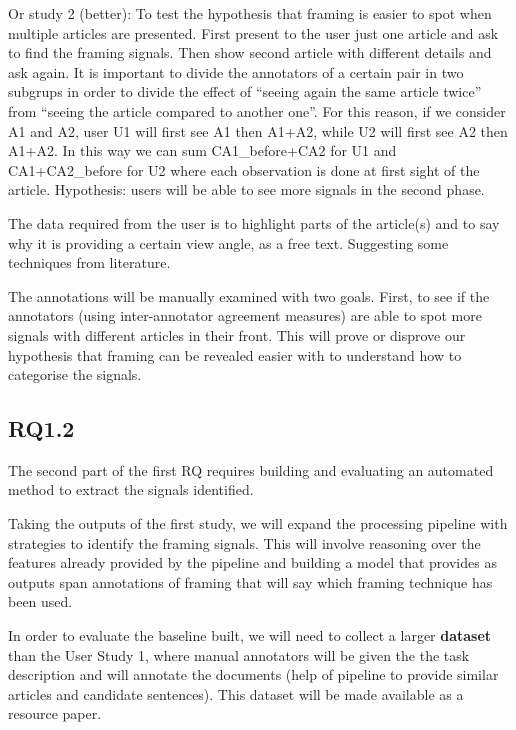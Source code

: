Or study 2 (better):
To test the hypothesis that framing is easier to spot when multiple articles are presented. First present to the user just one article and ask to find the framing signals. Then show second article with different details and ask again.
It is important to divide the annotators of a certain pair in two subgrups in order to divide the effect of ``seeing again the same article twice'' from ``seeing the article compared to another one''. For this reason, if we consider A1 and A2, user U1 will first see A1 then A1+A2, while U2 will first see A2 then A1+A2. In this way we can sum CA1\_before+CA2 for U1 and CA1+CA2\_before for U2 where each observation is done at first sight of the article.
Hypothesis: users will be able to see more signals in the second phase.

The data required from the user is to highlight parts of the article(s) and to say why it is providing a certain view angle, as a free text. Suggesting some techniques from literature.

The annotations will be manually examined with two goals.
First, to see if the annotators (using inter-annotator agreement measures) are able to spot more signals with different articles in their front.
This will prove or disprove our hypothesis that framing can be revealed easier with
to understand how to categorise the signals.




\subsection{RQ1.2}

The second part of the first RQ requires building and evaluating an automated method to extract the signals identified.

Taking the outputs of the first study, we will expand the processing pipeline with strategies to identify the framing signals. This will involve reasoning over the features already provided by the pipeline and building a model that provides as outputs span annotations of framing that will say which framing technique has been used.

In order to evaluate the baseline built, we will need to collect a larger \textbf{dataset} than the User Study 1, where manual annotators will be given the the task description and will annotate the documents (help of pipeline to provide similar articles and candidate sentences).
This dataset will be made available as a resource paper.


